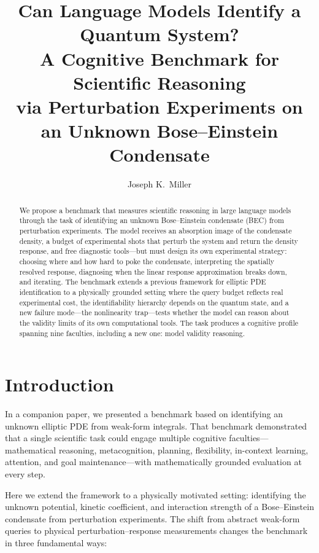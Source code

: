 \documentclass[11pt]{article}
\title{Can Language Models Identify a Quantum System?\\[4pt]
\large A Cognitive Benchmark for Scientific Reasoning\\via Perturbation Experiments on an Unknown Bose--Einstein Condensate}
\author{Joseph K.\ Miller}
\date{}
\begin{document}
\maketitle

\begin{abstract}
We propose a benchmark that measures scientific reasoning in large language models through the task of identifying an unknown Bose--Einstein condensate (BEC) from perturbation experiments. The model receives an absorption image of the condensate density, a budget of experimental shots that perturb the system and return the density response, and free diagnostic tools---but must design its own experimental strategy: choosing where and how hard to poke the condensate, interpreting the spatially resolved response, diagnosing when the linear response approximation breaks down, and iterating. The benchmark extends a previous framework for elliptic PDE identification to a physically grounded setting where the query budget reflects real experimental cost, the identifiability hierarchy depends on the quantum state, and a new failure mode---the nonlinearity trap---tests whether the model can reason about the validity limits of its own computational tools. The task produces a cognitive profile spanning nine faculties, including a new one: model validity reasoning.
\end{abstract}

\section{Introduction}

In a companion paper, we presented a benchmark based on identifying an unknown elliptic PDE from weak-form integrals. That benchmark demonstrated that a single scientific task could engage multiple cognitive faculties---mathematical reasoning, metacognition, planning, flexibility, in-context learning, attention, and goal maintenance---with mathematically grounded evaluation at every step.

Here we extend the framework to a physically motivated setting: identifying the unknown potential, kinetic coefficient, and interaction strength of a Bose--Einstein condensate from perturbation experiments. The shift from abstract weak-form queries to physical perturbation--response measurements changes the benchmark in three fundamental ways:
\end{document}
